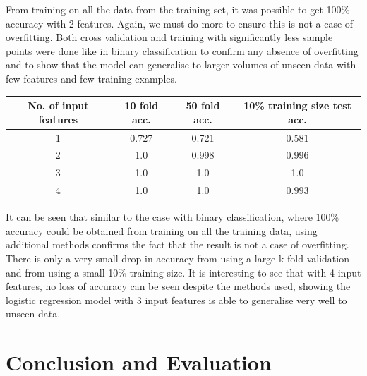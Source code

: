 \documentclass{article}
\begin{document}
From training on all the data from the training set, it was possible to get 100\% accuracy with 2 features. Again, we must do more to ensure this is not a case of overfitting. Both cross validation and training with significantly less sample points were done like in binary classification to confirm any absence of overfitting and to show that the model can generalise to larger volumes of unseen data with few features and few training examples. 
\begin{table}[H]
\centering
\begin{tabular}{| c | c | c | c |}
\hline
\textbf{No. of input features} & \textbf{10 fold acc.} & \textbf{50 fold acc.} & \textbf{10\% training size test acc.} \\
\hline
1 & 0.727 & 0.721 & 0.581 \\
\hline
2 & 1.0 & 0.998 & 0.996 \\
\hline
3 & 1.0 & 1.0 & 1.0 \\
\hline
4 & 1.0 & 1.0 & 0.993 \\
\hline
\end{tabular}
\end{table}
\noindent
It can be seen that similar to the case with binary classification, where 100\% accuracy could be obtained from training on all the training data, using additional methods confirms the fact that the result is not a case of overfitting. There is only a very small drop in accuracy from using a large k-fold validation and from using a small 10\% training size. It is interesting to see that with 4 input features, no loss of accuracy can be seen despite the methods used, showing the logistic regression model with 3 input features is able to generalise very well to unseen data. 
\section{Conclusion and Evaluation}

\end{document}
